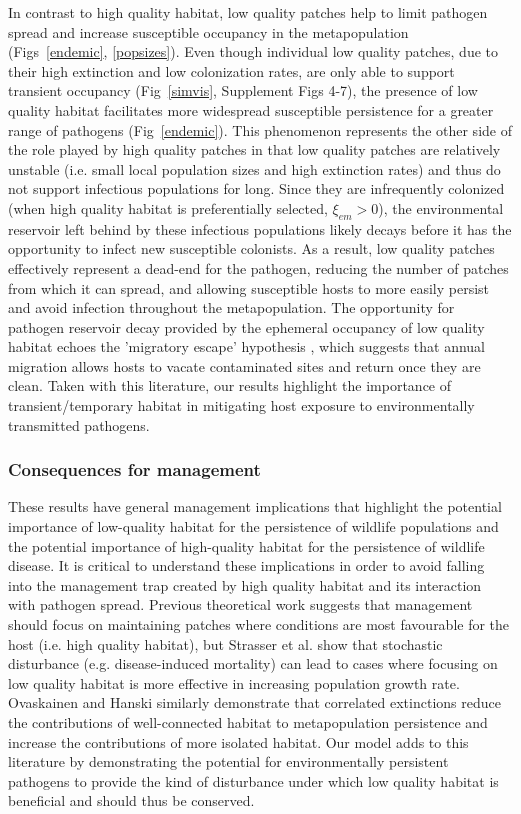 \documentclass{article}
\begin{document}
In contrast to high quality habitat, low quality patches help to limit pathogen spread and increase susceptible occupancy in the metapopulation (Figs~\ref{endemic}, \ref{popsizes}). 
Even though individual low quality patches, due to their high extinction and low colonization rates, are only able to support transient occupancy (Fig~\ref{simvis}, Supplement Figs 4-7), the presence of low quality habitat facilitates more widespread susceptible persistence for a greater range of pathogens (Fig~\ref{endemic}).  
This phenomenon represents the other side of the role played by high quality patches in that low quality patches are relatively unstable (i.e. small local population sizes and high extinction rates) and thus do not support infectious populations for long.
Since they are infrequently colonized (when high quality habitat is preferentially selected, $\xi_{em} > 0$), the environmental reservoir left behind by these infectious populations likely decays before it has the opportunity to infect new susceptible colonists. 
As a result, low quality patches effectively represent a dead-end for the pathogen, reducing the number of patches from which it can spread, and allowing susceptible hosts to more easily persist and avoid infection throughout the metapopulation.
The opportunity for pathogen reservoir decay provided by the ephemeral occupancy of low quality habitat echoes the 'migratory escape' hypothesis \cite{Loehle1995}, which suggests that annual migration allows hosts to vacate contaminated sites and return once they are clean.
Taken with this literature, our results highlight the importance of transient/temporary habitat in mitigating host exposure to environmentally transmitted pathogens.

\subsubsection*{Consequences for management}

These results have general management implications that highlight the potential importance of low-quality habitat for the persistence of wildlife populations and the potential importance of high-quality habitat for the persistence of wildlife disease.
It is critical to understand these implications in order to avoid falling into the management trap created by high quality habitat and its interaction with pathogen spread.
Previous theoretical work suggests that management should focus on maintaining patches where conditions are most favourable for the host (i.e. high quality habitat), but Strasser et al. \cite{Strasser2010} show that stochastic disturbance (e.g. disease-induced mortality) can lead to cases where focusing on low quality habitat is more effective in increasing population growth rate.
Ovaskainen and Hanski \cite{Ovaskainen2003a} similarly demonstrate that correlated extinctions reduce the contributions of well-connected habitat to metapopulation persistence and increase the contributions of more isolated habitat.
Our model adds to this literature by demonstrating the potential for environmentally persistent pathogens to provide the kind of disturbance under which low quality habitat is beneficial and should thus be conserved.
\end{document}

